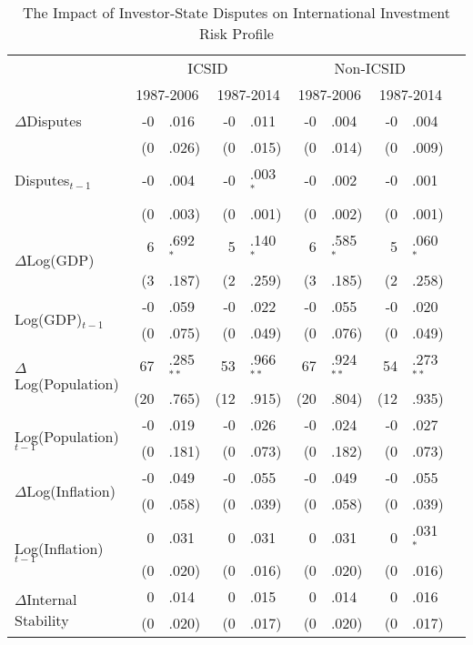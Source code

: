 \documentclass[12pt,onesided]{amsart}
\begin{document}
\begin{table}[ht]
\vspace{1cm}
\centering
{\footnotesize
\caption{The Impact of Investor-State Disputes on International Investment Risk Profile}
\label{tab:ecm}
\begin{tabular}{lr@{} lr@{}lr@{}lr@{}lr@{}}
	\hline\hline
	~ & \multicolumn{4}{c}{ICSID} & \multicolumn{4}{c}{Non-ICSID} \\
	~ & \multicolumn{2}{c}{1987-2006} & \multicolumn{2}{c}{1987-2014} & \multicolumn{2}{c}{1987-2006} & \multicolumn{2}{c}{1987-2014} \\
	\hline
  $\Delta$Disputes & -0&.016 & -0&.011 & -0&.004 & -0&.004 \\
~ & (0&.026) & (0&.015) & (0&.014) & (0&.009) \\
  Disputes$_{t-1}$ & -0&.004 & -0&.003$^{\ast}$ & -0&.002 & -0&.001 \\
  ~ & (0&.003) &  (0&.001) & (0&.002) & (0&.001) \\
  \multirow{2}{*}{$\Delta$Log(GDP)} & 6&.692$^{\ast}$ & 5&.140$^{\ast}$ & 6&.585$^{\ast}$ & 5&.060$^{\ast}$ \\
  & (3&.187) & (2&.259) & (3&.185) & (2&.258) \\
  \multirow{2}{*}{Log(GDP)$_{t-1}$} & -0&.059 & -0&.022 & -0&.055 & -0&.020\\
  & (0&.075) & (0&.049) & (0&.076) & (0&.049) \\
  \multirow{2}{*}{$\Delta$Log(Population)} & 67&.285$^{\ast\ast}$ & 53&.966$^{\ast\ast}$ & 67&.924$^{\ast\ast}$ & 54&.273$^{\ast\ast}$ \\
  & (20&.765) & (12&.915) & (20&.804) & (12&.935)\\
  \multirow{2}{*}{Log(Population)$_{t-1}$} & -0&.019 & -0&.026 & -0&.024 & -0&.027 \\
  & (0&.181) & (0&.073) & (0&.182) & (0&.073) \\
  \multirow{2}{*}{$\Delta$Log(Inflation)} & -0&.049 &  -0&.055 &  -0&.049 &  -0&.055 \\
  & (0&.058) &  (0&.039) &  (0&.058) &  (0&.039) \\
  \multirow{2}{*}{Log(Inflation)$_{t-1}$} & 0&.031 &  0&.031 &  0&.031 &  0&.031$^{\ast}$ \\
  & (0&.020) &  (0&.016) &  (0&.020) &  (0&.016) \\
  \multirow{2}{*}{$\Delta$Internal Stability} & 0&.014 & 0&.015 &  0&.014 &  0&.016 \\
  & (0&.020) &  (0&.017) &  (0&.020) &  (0&.017) \\

\end{tabular}}
\end{table}
\end{document}
